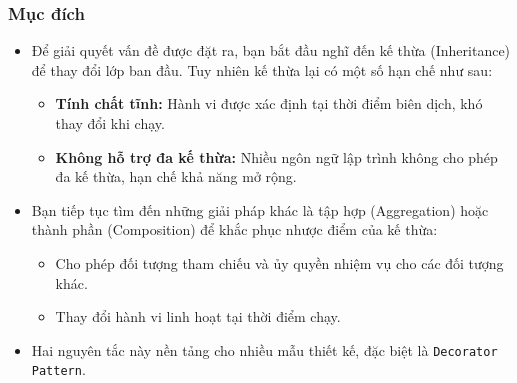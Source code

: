 \subsubsection{Mục đích}
\begin{itemize}
    \item Để giải quyết vấn đề được đặt ra, bạn bắt đầu nghĩ đến kế thừa (Inheritance) để thay đổi lớp ban đầu. Tuy nhiên kế thừa lại có một số hạn chế như sau:
          \begin{itemize}
              \item \textbf{Tính chất tĩnh:} Hành vi được xác định tại thời điểm biên dịch, khó thay đổi khi chạy.
              \item \textbf{Không hỗ trợ đa kế thừa:} Nhiều ngôn ngữ lập trình không cho phép đa kế thừa, hạn chế khả năng mở rộng.
          \end{itemize}

    \item Bạn tiếp tục tìm đến những giải pháp khác là tập hợp (Aggregation) hoặc thành phần (Composition) để khắc phục nhược điểm của kế thừa:
          \begin{itemize}
              \item Cho phép đối tượng tham chiếu và ủy quyền nhiệm vụ cho các đối tượng khác.
              \item Thay đổi hành vi linh hoạt tại thời điểm chạy.
          \end{itemize}
    \item Hai nguyên tắc này nền tảng cho nhiều mẫu thiết kế, đặc biệt là \verb|Decorator Pattern|.
\end{itemize}

